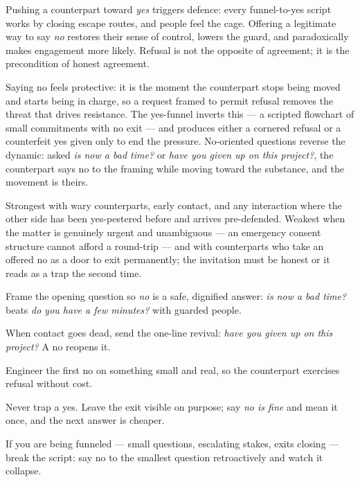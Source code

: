 \begin{core}
Pushing a counterpart toward \emph{yes} triggers defence: every funnel-to-yes script works by closing escape routes, and people feel the cage. Offering a legitimate way to say \emph{no} restores their sense of control, lowers the guard, and paradoxically makes engagement more likely. Refusal is not the opposite of agreement; it is the precondition of honest agreement.
\end{core}
\begin{mechanism}
Saying no feels protective: it is the moment the counterpart stops being moved and starts being in charge, so a request framed to permit refusal removes the threat that drives resistance. The yes-funnel inverts this --- a scripted flowchart of small commitments with no exit --- and produces either a cornered refusal or a counterfeit yes given only to end the pressure. No-oriented questions reverse the dynamic: asked \emph{is now a bad time?} or \emph{have you given up on this project?}, the counterpart says no to the framing while moving toward the substance, and the movement is theirs.
\end{mechanism}
\begin{conditions}
Strongest with wary counterparts, early contact, and any interaction where the other side has been yes-pestered before and arrives pre-defended. Weakest when the matter is genuinely urgent and unambiguous --- an emergency consent structure cannot afford a round-trip --- and with counterparts who take an offered no as a door to exit permanently; the invitation must be honest or it reads as a trap the second time.
\end{conditions}
\begin{application}
  \item Frame the opening question so \emph{no} is a safe, dignified answer: \emph{is now a bad time?} beats \emph{do you have a few minutes?} with guarded people.
  \item When contact goes dead, send the one-line revival: \emph{have you given up on this project?} A no reopens it.
  \item Engineer the first no on something small and real, so the counterpart exercises refusal without cost.
  \item Never trap a yes. Leave the exit visible on purpose; say \emph{no is fine} and mean it once, and the next answer is cheaper.
  \item If you are being funneled --- small questions, escalating stakes, exits closing --- break the script: say no to the smallest question retroactively and watch it collapse.
\end{application}

